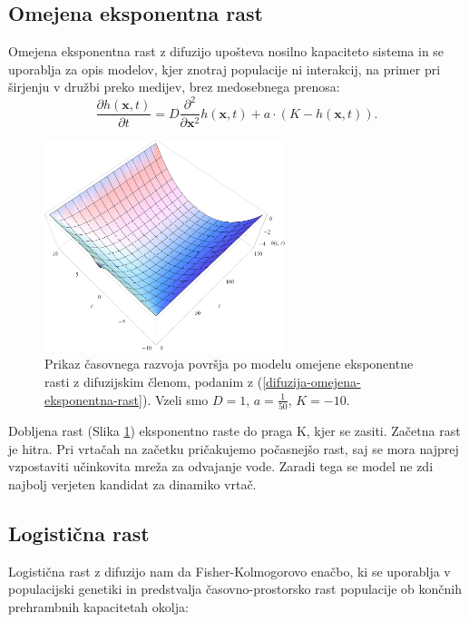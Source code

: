 \documentclass[a4paper, twoside, 12pt]{book}
\begin{document}
\subsection{Omejena eksponentna rast}

    Omejena eksponentna rast z difuzijo upošteva nosilno kapaciteto sistema in se uporablja za opis modelov, kjer znotraj populacije ni interakcij, na primer pri širjenju v družbi preko medijev, brez medosebnega prenosa:
    \begin{equation}
      \frac{ \partial h(\mathbf{x},t) }{ \partial t} = D \frac{\partial^2}{\partial \mathbf{x}^2} h(\mathbf{x},t) + a \cdot (K - h(\mathbf{x},t)).
      \label{difuzija-omejena-eksponentna-rast}
    \end{equation}
    \begin{figure}[h!]
      \begin{center}
        \includegraphics[width=7cm]{slike/difuzija-omejena-eksponentna-rast2}
      \end{center}
      \caption{Prikaz časovnega razvoja površja po modelu omejene eksponentne rasti z difuzijskim členom, podanim z (\ref{difuzija-omejena-eksponentna-rast}). Vzeli smo $D=1$, $a=\frac{1}{50}$, $K=-10$.}
      \label{fig:difuzija-omejena-eksponentna-rast}
    \end{figure}

    Dobljena rast (Slika \ref{fig:difuzija-omejena-eksponentna-rast}) eksponentno raste do praga K, kjer se zasiti. Začetna rast je hitra. Pri vrtačah na začetku pričakujemo počasnejšo rast, saj se mora najprej vzpostaviti učinkovita mreža za odvajanje vode. Zaradi tega se model ne zdi najbolj verjeten kandidat za dinamiko vrtač.


    \subsection{Logistična rast}
Logistična rast z difuzijo nam da Fisher-Kolmogorovo enačbo, ki se uporablja v populacijski genetiki in predstvalja časovno-prostorsko rast populacije ob končnih prehrambnih kapacitetah okolja:
\end{document}
